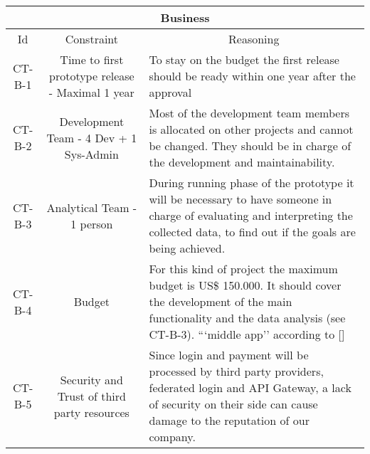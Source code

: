 \begin{table}[H]
    \begin{tabularx}{\textwidth}{|c|c|X|}
        \hline
        \multicolumn{3}{c}{\textbf{Business}} \\
        \hline
        \toprule
        \multicolumn{1}{c}{Id} & \multicolumn{1}{c}{Constraint} & \multicolumn{1}{c}{Reasoning} \\
        \midrule
        CT-B-1 & Time to first prototype release - Maximal 1 year & To stay on the budget the first release should
        be ready within one year after the approval \\
        CT-B-2 & Development Team - 4 Dev + 1 Sys-Admin & Most of the development team members is allocated on
        other projects and cannot be changed. They should be in charge of the development and maintainability. \\
        CT-B-3 & Analytical Team - 1 person & During running phase of the prototype it will be necessary to have someone 
        in charge of evaluating and interpreting the collected data, to find out if the goals are being achieved. \\
        CT-B-4 & Budget & For this kind of project the maximum budget is US\$ 150.000. It should cover the development of 
        the main functionality and the data analysis (see CT-B-3).  ```middle app'' according to [\cite{refonline:SPDLOAD}] \\
        CT-B-5 & Security and Trust of third party resources & Since login and payment will be processed by third party providers,
        \gls{federated login} and \gls{API Gateway}, a lack of security on their side can cause damage to the reputation of 
        our company. \\
        \bottomrule
    \end{tabularx}
\end{table}



